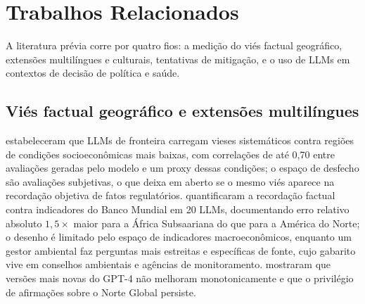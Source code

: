 \section{Trabalhos Relacionados}
\label{sec:related}

A literatura prévia corre por quatro fios: a medição do viés factual
geográfico, extensões multilíngues e culturais, tentativas de mitigação, e o uso
de LLMs em contextos de decisão de política e saúde.

\subsection{Viés factual geográfico e extensões multilíngues}

\citet{manvi2024llm} estabeleceram que LLMs de fronteira carregam vieses
sistemáticos contra regiões de condições socioeconômicas mais baixas, com
correlações de até 0,70 entre avaliações geradas pelo modelo e um proxy dessas
condições; o espaço de desfecho são avaliações subjetivas, o que deixa em aberto
se o mesmo viés aparece na recordação objetiva de fatos regulatórios.
\citet{moayeri2024worldbench} quantificaram a recordação factual contra
indicadores do Banco Mundial em 20 LLMs, documentando erro relativo absoluto
$1{,}5\times$ maior para a África Subsaariana do que para a América do Norte; o
desenho é limitado pelo espaço de indicadores macroeconômicos, enquanto um
gestor ambiental faz perguntas mais estreitas e específicas de fonte, cujo
gabarito vive em conselhos ambientais e agências de monitoramento.
\citet{mirza2024global} mostraram que versões mais novas do GPT-4 não melhoram
monotonicamente e que o privilégio de afirmações sobre o Norte Global persiste.

